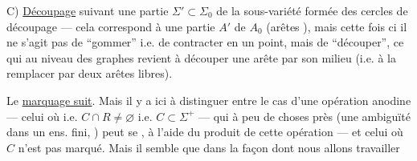 
C) \uline{Découpage}  suivant une partie 
$\Sigma'\subset\Sigma_0$ de la sous-variété formée des cercles de découpage --- cela correspond à une partie $A'$ de $A_0$ (arêtes  ), mais cette fois ci il ne s'agit pas de ``gommer'' i.e. de contracter en un point, mais de ``découper'', ce qui au niveau des graphes revient à découper une arête par son milieu (i.e. à la remplacer par deux arêtes libres).

Le \uline{marquage suit}. 
Mais il y a ici à distinguer entre le cas d'une opération anodine  --- celui
où 
 i.e. $C\cap R\ne\varnothing$ i.e. $C\subset\Sigma^+$ --- qui à peu de choses près (une ambiguïté dans un ens. fini, \deleted{)} ) peut se , à l'aide du produit de cette opération --- et celui où $C$ n'est pas marqué.
Mais il semble que dans la façon dont nous allons travailler
